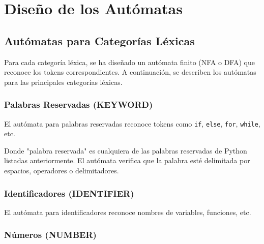 \documentclass[12pt,letterpaper]{report}
\begin{document}
\chapter{Diseño de los Autómatas}

\section{Autómatas para Categorías Léxicas}

Para cada categoría léxica, se ha diseñado un autómata finito (NFA o DFA) que reconoce los tokens correspondientes. A continuación, se describen los autómatas para las principales categorías léxicas.

\subsection{Palabras Reservadas (KEYWORD)}

El autómata para palabras reservadas reconoce tokens como \texttt{if}, \texttt{else}, \texttt{for}, \texttt{while}, etc.


Donde "palabra reservada" es cualquiera de las palabras reservadas de Python listadas anteriormente. El autómata verifica que la palabra esté delimitada por espacios, operadores o delimitadores.

\subsection{Identificadores (IDENTIFIER)}

El autómata para identificadores reconoce nombres de variables, funciones, etc.


\subsection{Números (NUMBER)}
\end{document}
